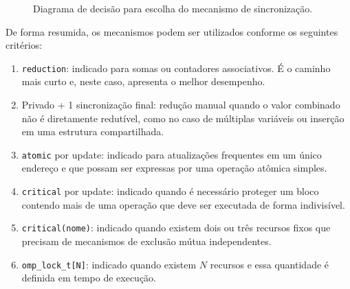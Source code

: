 \documentclass[11pt,letterpaper]{article}
\begin{document}
\begin{figure}[H]
{%
}

\caption{Diagrama de decisão para escolha do mecanismo de sincronização.}

\label{fig:decisao}

\end{figure}

De forma resumida, os mecanismos podem ser utilizados conforme os
seguintes critérios:

\begin{enumerate}

\item \texttt{reduction}: indicado para somas ou contadores associativos.
É o caminho mais curto e, neste caso, apresenta o melhor desempenho.

\item Privado + 1 sincronização final: redução manual quando o valor
combinado não é diretamente redutível, como no caso de múltiplas
variáveis ou inserção em uma estrutura compartilhada.

\item \texttt{atomic} por update: indicado para atualizações frequentes
em um único endereço e que possam ser expressas por uma operação
atômica simples.

\item \texttt{critical} por update: indicado quando é necessário proteger
um bloco contendo mais de uma operação que deve ser executada de forma
indivisível.

\item \texttt{critical(nome)}: indicado quando existem dois ou três
recursos fixos que precisam de mecanismos de exclusão mútua
independentes.

\item \texttt{omp\_lock\_t[N]}: indicado quando existem $N$ recursos e
essa quantidade é definida em tempo de execução.

\end{enumerate}
\end{document}
